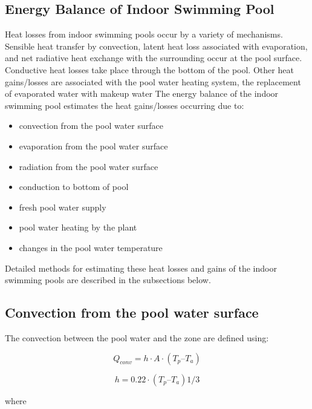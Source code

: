 \subsection{Energy Balance of Indoor Swimming Pool}\label{energy-balance-of-indoor-swimming-pool}

Heat losses from indoor swimming pools occur by a variety of mechanisms. Sensible heat transfer by convection, latent heat loss associated with evaporation, and net radiative heat exchange with the surrounding occur at the pool surface. Conductive heat losses take place through the bottom of the pool. Other heat gains/losses are associated with the pool water heating system, the replacement of evaporated water with makeup water The energy balance of the indoor swimming pool estimates the heat gains/losses occurring due to:

\begin{itemize}
\tightlist
\item
  convection from the pool water surface
\item
  evaporation from the pool water surface
\item
  radiation from the pool water surface
\item
  conduction to bottom of pool
\item
  fresh pool water supply
\item
  pool water heating by the plant
\item
  changes in the pool water temperature
\end{itemize}

Detailed methods for estimating these heat losses and gains of the indoor swimming pools are described in the subsections below.

\subsection{Convection from the pool water surface}\label{convection-from-the-pool-water-surface}

The convection between the pool water and the zone are defined using:

\begin{equation}
Q_{conv} = h \cdot A \cdot (T_p – T_a)
\end{equation}

\begin{equation}
h = 0.22 \cdot (T_p – T_a)1/3
\end{equation}

where

